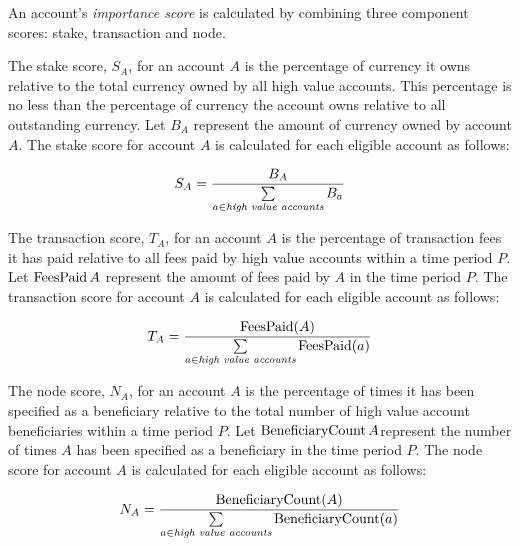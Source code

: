 An account's \emph{importance score} is calculated by combining three component scores: stake, transaction and node.

The stake score, $S_A$, for an account $A$ is the percentage of currency it owns relative to the total currency owned by all high value accounts.
This percentage is no less than the percentage of currency the account owns relative to all outstanding currency.
Let $B_A$ represent the amount of currency owned by account $A$.
The stake score for account $A$ is calculated for each eligible account as follows:

\begin{equation}
S_A = \frac{B_A}{\sum\limits_{\substack{a \in \textit{high value accounts}}} B_a}
\end{equation}

The transaction score, $T_A$, for an account $A$ is the percentage of transaction fees it has paid relative to all fees paid by high value accounts within a time period $P$.
Let $\operatorname{FeesPaid}{A}$ represent the amount of fees paid by $A$ in the time period $P$.
The transaction score for account $A$ is calculated for each eligible account as follows:

\begin{equation}
T_A = \frac{\operatorname{FeesPaid}(A)}{\sum\limits_{\substack{a \in \textit{high value accounts}}} \operatorname{FeesPaid}(a)}
\end{equation}

The node score, $N_A$, for an account $A$ is the percentage of times it has been specified as a beneficiary relative to the total number of high value account beneficiaries within a time period $P$.
Let $\operatorname{BeneficiaryCount}{A}$represent the number of times $A$ has been specified as a beneficiary in the time period $P$.
The node score for account $A$ is calculated for each eligible account as follows:

\begin{equation}
N_A = \frac{\operatorname{BeneficiaryCount}(A)}{\sum\limits_{\substack{a \in \textit{high value accounts}}} \operatorname{BeneficiaryCount}(a)}
\end{equation}

